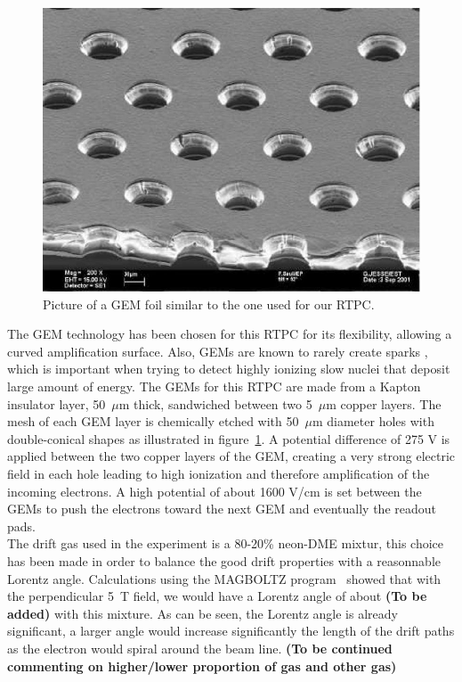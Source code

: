 \documentclass[twocolumn,showpacs,superscriptaddress,groupedaddress]{revtex4}
\begin{document}
\begin{figure}[tbp]
\centering
\includegraphics[scale=0.70]{fig/GEM_photo.jpg}
\caption{Picture of a GEM foil similar to the one used for our RTPC.} 
\label{fig:GEMs}
\end{figure}

The GEM technology has been chosen for this RTPC for its flexibility, 
allowing a curved amplification surface. Also, GEMs are known to rarely create 
sparks{\color{blue} \cite{GEM_ref}}, which is important when trying to detect 
highly ionizing slow nuclei that deposit large amount of energy. The GEMs for 
this RTPC are made from a Kapton insulator layer, {\color{blue}50~$\mu$m 
thick}, sandwiched between two 5~$\mu$m copper layers. The mesh of each GEM 
layer is chemically etched with 50~$\mu$m diameter holes with double-conical 
shapes as illustrated in figure~\ref{fig:GEMs}. A potential difference of 275 V 
is applied between the two 
copper layers of the GEM, creating a very strong electric field in each hole 
leading to high ionization and therefore amplification of the incoming 
electrons. A high potential of about 1600 V/cm is set between 
the GEMs to push the electrons toward the next GEM and eventually the readout 
pads. \\

The drift gas used in the experiment is a 80-20\% neon-DME mixtur, this choice 
has been made in order to balance the good drift properties with a reasonnable
Lorentz angle. Calculations using the MAGBOLTZ program~\cite{MAGBOLTZ} 
showed that with the perpendicular 5~T field, we would have a Lorentz angle of 
about {\bf \color{red} (To be added) } with this mixture. As can be seen, the
Lorentz angle is already significant, a larger angle would increase significantly
the length of the drift paths as the electron would spiral around the beam line.
{\bf \color{red} (To be continued commenting on higher/lower proportion of gas 
and other gas) }
\end{document}
